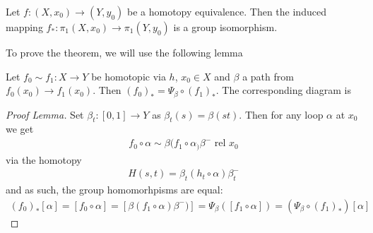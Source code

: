 \begin{thm}[]
  Let $f: (X,x_0) \to (Y,y_0)$ be a homotopy equivalence.
  Then the induced mapping $f_{\ast}: \pi_1(X,x_0) \to  \pi_1(Y,y_0)$ is a group isomorphism.
\end{thm}
To prove the theorem, we will use the following lemma
\begin{lem}[]
  Let $f_0 \sim f_1: X \to Y$ be homotopic via $h$, $x_0 \in X$ and $\beta$ a path from $f_0(x_0) \to f_1(x_0)$.
  Then $(f_0)_{\ast} = \Psi_{\beta} \circ (f_1)_{\ast}$.
  The corresponding diagram is
  \begin{center}
  \end{center}
\end{lem}
\begin{proof}[Proof Lemma]
  Set $\beta_t:[0,1] \to Y$ as $\beta_{t}(s) = \beta(st)$.
  Then for any loop $\alpha$ at $x_0$ we get
  \begin{align*}
    f_0 \circ \alpha \sim \beta (f_1 \circ \alpha_)\beta^{-} \text{ rel }x_0
  \end{align*}
  via the homotopy
  \begin{align*}
    H(s,t) = \beta_t(h_t \circ \alpha)\beta_t^{-}
  \end{align*}
  and as such, the group homomorhpisms are equal:
  \begin{align*}
    (f_0)_{\ast}[\alpha] = [f_0 \circ \alpha] = [\beta(f_1 \circ \alpha)\beta^{-})] = \Psi_{\beta}([f_1 \circ \alpha]) = (\Psi_{\beta} \circ (f_1)_{\ast})[\alpha]
  \end{align*}
\end{proof}

